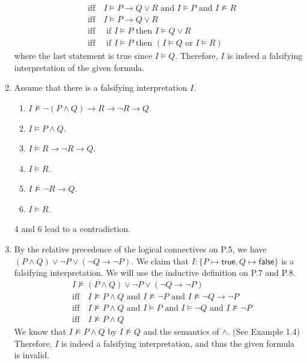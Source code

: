 \begin{exer}[1.1]
\begin{enumerate}[label=(\alph*)]
\begin{align*}
                    &\text{iff}\quad I \models P \rightarrow Q \lor R \text{ and } I \models P \text{ and } I \not\models R \\
                    &\text{iff}\quad I \models P \rightarrow Q \lor R \\
                    &\text{iff}\quad \text{ if } I \models P \text{ then } I \models Q \lor R \\
                    &\text{iff}\quad \text{ if } I \models P \text{ then } (I \models Q \text{ or } I \models R)
            \end{align*}
            where the last statement is true since $I \models Q$.
            Therefore, $I$ is indeed a falsifying interpretation of the given formula.
        \item
            Assume that there is a falsifying interpretation $I$.
            \begin{enumerate}[label=\arabic*.]
                \item %
                    $I \not\models \neg(P \land Q) \rightarrow R \rightarrow \neg R \rightarrow Q$.
                \item %
                    $I \models P \land Q$.
                \item %
                    $I \models R \rightarrow \neg R \rightarrow Q$.
                \item %
                    $I \models R$.
                \item %
                    $I \not\models \neg R \rightarrow Q$.
                \item %
                    $I \models R$.
            \end{enumerate}
            4 and 6 lead to a contradiction.
        \item
            By the relative precedence of the logical connectives on P.5, we have $(P \land Q) \lor \neg P \lor (\neg Q \rightarrow \neg P)$.
            We claim that $I: \{ P \mapsto \textsf{true}, Q \mapsto \textsf{false} \}$ is a falsifying interpretation.
            We will use the inductive definition on P.7 and P.8.
            \begin{align*}
                &I \not\models (P \land Q) \lor \neg P \lor (\neg Q \rightarrow \neg P) \\
                    &\text{iff}\quad I \not\models P \land Q \text{ and } I \not\models \neg P \text{ and } I \not\models \neg Q \rightarrow \neg P \\
                    &\text{iff}\quad I \not\models P \land Q \text{ and } I \models P \text{ and } I \models \neg Q \text{ and } I \not\models\neg P \\
                    &\text{iff}\quad I \not\models P \land Q
            \end{align*}
            We know that $I \not\models P \land Q$ by $I \not\models Q$ and the semantics of $\land$.
            (See Example 1.4)
            Therefore, $I$ is indeed a falsifying interpretation, and thus the given formula is invalid.
    \end{enumerate}
\end{exer}

